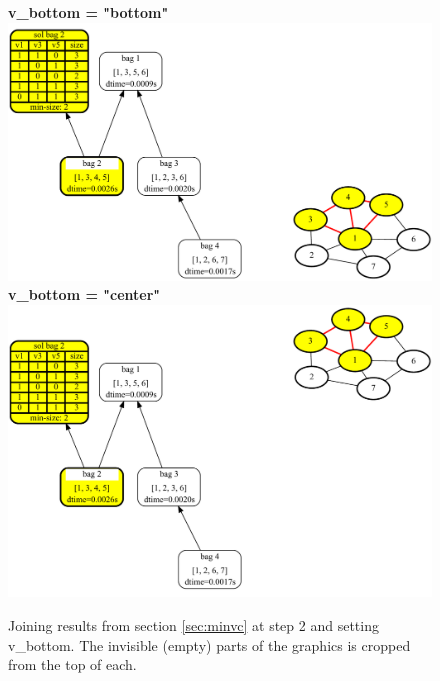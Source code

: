 \documentclass[a4paper, 12pt, bibliography=totoc]{scrartcl}
\begin{document}
\begin{figure}[H]
	\centering
	\textbf{v\_bottom = "bottom"} \vspace{1em}\\
	
	\includegraphics[width=\linewidth]{images/SVGJOIN/default_bottom2.pdf}\\
	\vspace{0.5em}
	\textbf{v\_bottom = "center"}\\
	
	\vspace{0.6em}
	\includegraphics[width=0.9\linewidth]{images/SVGJOIN/default_center2.pdf}
	\caption{Joining results from section \ref{sec:minvc} at step 2 and setting v\_bottom. The invisible (empty) parts of the graphics is cropped from the top of each.}
	\label{fig:joinbotcenter}
\end{figure}
\end{document}

